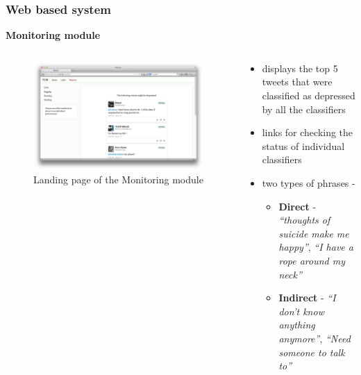 \documentclass[9pt]{beamer}
\begin{document}
    \begin{frame}
        \frametitle{Web based system}
        \begin{center}
            \textbf{Monitoring module}
        \end{center}
        \begin{columns}
            \begin{column}{0.5\textwidth}
                \begin{figure}
                    \centering
                    \includegraphics[width=\textwidth]{figures/monitoring_landing_1.png}
                    \caption{Landing page of the Monitoring module}
                \end{figure}
            \end{column}
            \begin{column}{0.5\textwidth}
                \begin{itemize}
                    \item{displays the top 5 tweets that were classified as depressed by all the classifiers}
                    \item{links for checking the status of individual classifiers}
                    \item{
                    two types of phrases -
                    \begin{itemize}
                        \item{\textbf{Direct} - \emph{``thoughts of suicide make me happy''}, \emph{``I have a rope around my neck''}}
                        \item{\textbf{Indirect} - \emph{``I don't know anything anymore''}, \emph{``Need someone to talk to''}}
                    \end{itemize}
                    }
                \end{itemize}
            \end{column}
        \end{columns}
    \end{frame}
    
\end{document}
